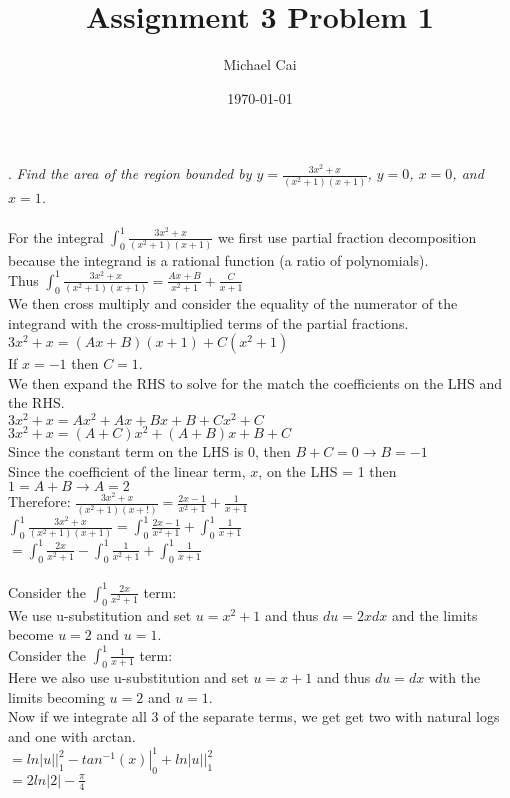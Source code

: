 \documentclass[11pt, oneside]{article}   	%
\title{Assignment 3 Problem 1}
\author{Michael Cai}
\date{\today}							%
\begin{document}
\maketitle

. \textit{Find the area of the region bounded by $y = \frac{3x^2+x}{(x^2+1)(x+1)}$, $y=0$, $x=0$, and $x=1$.}\\~\\
For the integral $\int_0^1 \frac{3x^2+x}{(x^2+1)(x+1)}$ we first use partial fraction decomposition because the integrand is a rational function (a ratio of polynomials).\\
Thus $\int_0^1 \frac{3x^2+x}{(x^2+1)(x+1)} = \frac{Ax + B}{x^2+1} + \frac{C}{x+1}$\\
We then cross multiply and consider the equality of the numerator of the integrand with the cross-multiplied terms of the partial fractions.\\
$3x^2 + x = (Ax + B)(x+1) + C(x^2+1)$\\
If $x = -1$ then $C=1$.\\
We then expand the RHS to solve for the match the coefficients on the LHS and the RHS.\\
$3x^2 + x = Ax^2 + Ax + Bx + B + Cx^2 + C$\\
$3x^2 + x = (A+C)x^2 + (A+B)x + B+C$\\
Since the constant term on the LHS is 0, then $B+C = 0 \rightarrow B = -1$\\
Since the coefficient of the linear term, $x$, on the LHS = 1 then $1 = A+B \rightarrow A = 2$\\
Therefore: $\frac{3x^2+x}{(x^2+1)(x+!)} = \frac{2x-1}{x^2+1} + \frac{1}{x+1}$\\
$\int_0^1 \frac{3x^2+x}{(x^2+1)(x+1)} = \int_0^1 \frac{2x-1}{x^2+1} + \int_0^1 \frac{1}{x+1}$\\
$= \int_0^1 \frac{2x}{x^2+1} - \int_0^1 \frac{1}{x^2+1} + \int_0^1 \frac{1}{x+1}$\\~\\
Consider the $\int_0^1 \frac{2x}{x^2+1}$ term:\\
We use u-substitution and set $u= x^2 + 1$ and thus $du = 2xdx$ and the limits become $u = 2$ and $u = 1$.\\
Consider the $\int_0^1 \frac{1}{x+1}$ term:\\
Here we also use u-substitution and set $u = x+1$ and thus $du = dx$ with the limits becoming $u = 2$ and $u = 1$.\\
Now if we integrate all 3 of the separate terms, we get get two with natural logs and one with arctan.\\
$= \left. ln|u| \right|_1^2 - \left. tan^{-1}(x) \right|_0^1 + \left. ln|u| \right|_1^2$\\
$= 2ln|2| - \frac{\pi}{4}$
\end{document}
